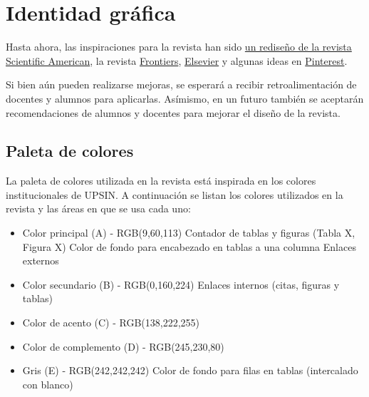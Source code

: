 \chapter{Identidad gráfica}

Hasta ahora, las inspiraciones para la revista han sido \href{https://www.pentagram.com/work/scientific-american?rel=sector&rel-id=3}{un rediseño de la revista Scientific American}, la revista \href{https://www.frontiersin.org/journals/sustainability/articles/10.3389/frsus.2026.1818134/pdf}{Frontiers}, \href{https://www.sciencedirect.com/science/article/pii/S1198743X26000650/pdfft?pid=1-s2.0-S1198743X26000650-main.pdf}{Elsevier} y algunas ideas en \href{https://pin.it/3s68QTUbZ}{Pinterest}.

Si bien aún pueden realizarse mejoras, se esperará a recibir retroalimentación de docentes y alumnos para aplicarlas. Asímismo, en un futuro también se aceptarán recomendaciones de alumnos y docentes para mejorar el diseño de la revista.

\section{Paleta de colores}

La paleta de colores utilizada en la revista está inspirada en los colores institucionales de UPSIN. A continuación se listan los colores utilizados en la revista y las áreas en que se usa cada uno:

    


\begin{itemize}
    \item Color principal (A) - RGB(9,60,113)
        \subitem Contador de tablas y figuras (Tabla X, Figura X)
        \subitem Color de fondo para encabezado en tablas a una columna
        \subitem Enlaces externos
    \item Color secundario (B) - RGB(0,160,224)
        \subitem Enlaces internos (citas, figuras y tablas)
    \item Color de acento (C) - RGB(138,222,255)
    \item Color de complemento (D) - RGB(245,230,80)
    \item Gris (E) - RGB(242,242,242)
        \subitem Color de fondo para filas en tablas (intercalado con blanco)
\end{itemize}

